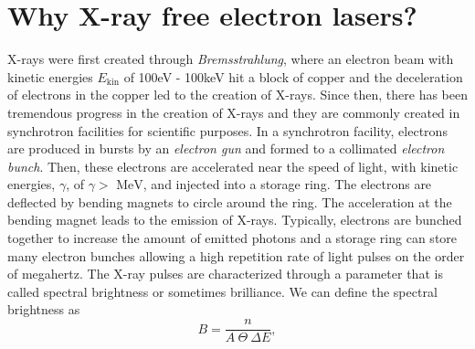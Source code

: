 \section{Why X-ray free electron lasers?}\label{sec:xfel}
X-rays were first created through \textit{Bremsstrahlung}, where an electron beam with kinetic energies $E_{\text{kin}}$ of 100eV - 100keV hit a block of copper and the deceleration of electrons in the copper led to the creation of X-rays. Since then, there has been tremendous progress in the creation of X-rays and they are commonly created in synchrotron facilities for scientific purposes. In a synchrotron facility, electrons are produced in bursts by an \textit{electron gun} and formed to a collimated \textit{electron bunch}. Then, these electrons are accelerated near the speed of light, with kinetic energies, $\gamma$, of $\gamma>\text{ MeV}$, and injected into a storage ring. The electrons are deflected by bending magnets to circle around the ring. The acceleration at the bending magnet leads to the emission of X-rays. Typically, electrons are bunched together to increase the amount of emitted photons and a storage ring can store many electron bunches allowing a high repetition rate of light pulses on the order of megahertz. The X-ray pulses are characterized through a parameter that is called spectral brightness \cite{Mills-2005-IUCR} or sometimes brilliance. We can define the spectral brightness as \cite{Als-Nielson-2011-JWS}
\begin{equation}
B = \frac{n}{A\ \Theta\ \Delta\! E},
\label{eq:spectral-brightness}
\end{equation}

